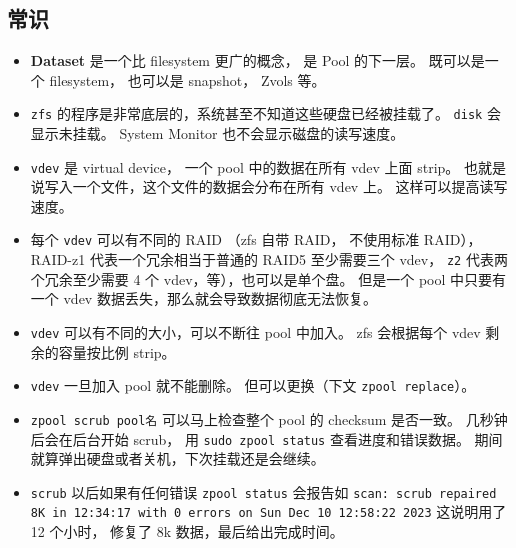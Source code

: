 \subsection{常识}
\begin{itemize}
\item \textbf{Dataset} 是一个比 filesystem 更广的概念， 是 Pool 的下一层。 既可以是一个 filesystem， 也可以是 snapshot， Zvols 等。
\item \verb|zfs| 的程序是非常底层的，系统甚至不知道这些硬盘已经被挂载了。 \verb|disk| 会显示未挂载。 System Monitor 也不会显示磁盘的读写速度。
\item \verb|vdev| 是 virtual device， 一个 pool 中的数据在所有 vdev 上面 strip。 也就是说写入一个文件，这个文件的数据会分布在所有 vdev 上。 这样可以提高读写速度。
\item 每个 \verb|vdev| 可以有不同的 RAID （zfs 自带 RAID， 不使用标准 RAID），RAID-z1 代表一个冗余相当于普通的 RAID5 至少需要三个 vdev， \verb|z2| 代表两个冗余至少需要 4 个 vdev，等），也可以是单个盘。 但是一个 pool 中只要有一个 vdev 数据丢失，那么就会导致数据彻底无法恢复。
\item \verb|vdev| 可以有不同的大小，可以不断往 pool 中加入。 zfs 会根据每个 vdev 剩余的容量按比例 strip。
\item \verb|vdev| 一旦加入 pool 就不能删除。 但可以更换（下文 \verb|zpool replace|）。
\item \verb|zpool scrub pool名| 可以马上检查整个 pool 的 checksum 是否一致。 几秒钟后会在后台开始 scrub， 用 \verb|sudo zpool status| 查看进度和错误数据。 期间就算弹出硬盘或者关机，下次挂载还是会继续。
\item \verb`scrub` 以后如果有任何错误 \verb`zpool status` 会报告如 \verb`scan: scrub repaired 8K in 12:34:17 with 0 errors on Sun Dec 10 12:58:22 2023` 这说明用了 12 个小时， 修复了 8k 数据，最后给出完成时间。
\end{itemize}

